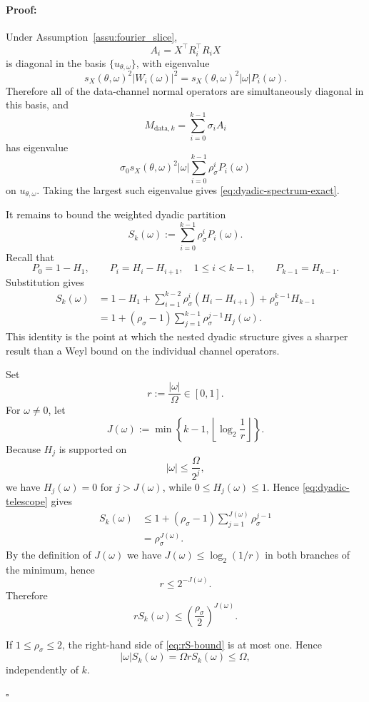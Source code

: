 \documentclass{article}
\newenvironment{proof}{\paragraph{Proof:}}{\hfill$\square$}
\begin{document}
\begin{proof}
Under Assumption~\ref{assu:fourier_slice},
\[
A_i
=
X^\top R_i^\top R_iX
\]
is diagonal in the basis $\{u_{\theta,\omega}\}$, with eigenvalue
\[
s_X(\theta,\omega)^2
|W_i(\omega)|^2
=
s_X(\theta,\omega)^2
|\omega|P_i(\omega).
\]
Therefore all of the data-channel normal operators are
simultaneously diagonal in this basis, and
\[
M_{\mathrm{data},k}
=
\sum_{i=0}^{k-1}\sigma_iA_i
\]
has eigenvalue
\[
\sigma_0
s_X(\theta,\omega)^2
|\omega|
\sum_{i=0}^{k-1}
\rho_\sigma^iP_i(\omega)
\]
on $u_{\theta,\omega}$.  Taking the largest such eigenvalue gives
\eqref{eq:dyadic-spectrum-exact}.

It remains to bound the weighted dyadic partition
\[
S_k(\omega)
:=
\sum_{i=0}^{k-1}
\rho_\sigma^iP_i(\omega).
\]
Recall that
\[
P_0=1-H_1,
\qquad
P_i=H_i-H_{i+1},
\quad
1\le i<k-1,
\qquad
P_{k-1}=H_{k-1}.
\]
Substitution gives
\begin{align}
S_k(\omega)
&=
1-H_1
+
\sum_{i=1}^{k-2}
\rho_\sigma^i(H_i-H_{i+1})
+
\rho_\sigma^{k-1}H_{k-1}
\nonumber\\
&=
1
+
(\rho_\sigma-1)
\sum_{j=1}^{k-1}
\rho_\sigma^{j-1}H_j(\omega).
\label{eq:dyadic-telescope}
\end{align}
This identity is the point at which the nested dyadic structure
gives a sharper result than a Weyl bound on the individual channel
operators.

Set
\[
r:=\frac{|\omega|}{\Omega}\in[0,1].
\]
For $\omega\neq0$, let
\[
J(\omega)
:=
\min
\left\{
k-1,
\left\lfloor
\log_2\frac{1}{r}
\right\rfloor
\right\}.
\]
Because $H_j$ is supported on
\[
|\omega|\le\frac{\Omega}{2^j},
\]
we have $H_j(\omega)=0$ for $j>J(\omega)$, while
$0\le H_j(\omega)\le1$.  Hence \eqref{eq:dyadic-telescope} gives
\begin{align}
S_k(\omega)
&\le
1+
(\rho_\sigma-1)
\sum_{j=1}^{J(\omega)}
\rho_\sigma^{j-1}
\nonumber\\
&=
\rho_\sigma^{J(\omega)}.
\label{eq:S-bound}
\end{align}
By the definition of $J(\omega)$ we have
$J(\omega)\le\log_2(1/r)$ in both branches of the minimum, hence
\[
r\le 2^{-J(\omega)} .
\]
Therefore
\begin{equation}
\label{eq:rS-bound}
rS_k(\omega)
\le
\left(\frac{\rho_\sigma}{2}\right)^{J(\omega)}.
\end{equation}

If $1\le\rho_\sigma\le2$, the right-hand side of
\eqref{eq:rS-bound} is at most one.  Hence
\[
|\omega|S_k(\omega)
=
\Omega rS_k(\omega)
\le\Omega,
\]
independently of $k$.


\end{proof}
\end{document}
